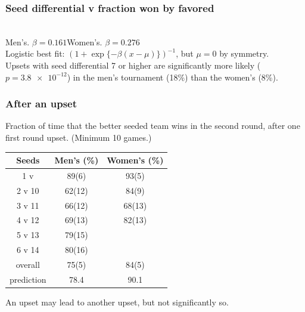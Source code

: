 \documentclass{beamer}
\begin{document}
\begin{frame}
\frametitle{Seed differential v fraction won by favored}
{}%
\hfill
{}%
\\\medskip
\hfill Men's. $\beta=0.161$\hfill Women's. $\beta=0.276$\hfill\null\\
Logistic best fit: $(1+\exp\{-\beta(x-\mu)\})^{-1}$, but $\mu=0$ by symmetry.\\
Upsets with seed differential 7 or higher are significantly more likely ($p=\num{3.8e-12}$) in the men's tournament (18\%) than the women's (8\%).
\end{frame}

\begin{frame}
\frametitle{After an upset}
Fraction of time that the better seeded team wins in the second round, after one first round upset.  (Minimum 10 games.)
\begin{center}
\begin{tabular}{ c *2{S[table-format=2(2), separate-uncertainty]} }\toprule
Seeds & {Men's (\%)} & {Women's (\%)} \\ v  & 89(6) & 93(5) \\
2 v 10 & 62(12) & 84(9) \\
3 v 11 & 66(12) & 68(13) \\
4 v 12 & 69(13) & 82(13) \\
5 v 13 & 79(15) \\
6 v 14 & 80(16) \\\addlinespace
overall & 75(5) & 84(5)\\
prediction & 78.4 & 90.1 \\\bottomrule
\end{tabular}
\end{center}
An upset may lead to another upset, but not significantly so.
\end{frame}
\end{document}
